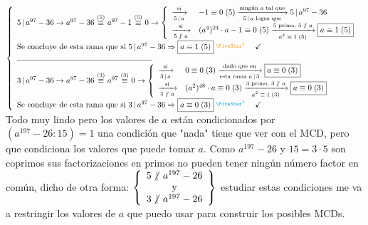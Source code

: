 $\llave{l}{
		5 \divideA a^{97} - 36 \to a^{97} - 36 \conga{5} a^{97} -1 \conga5 0
		\to
		\llave{ll}{
			\flecha{si}[$5 \divideA a$] & \congruencia{-1}{0}{5}
			\flecha{ningún $a$ tal que}[$5 \divideA a$ logra que] 5 \divideA a^{97} - 36 \\

			\flecha{si}[$5 \noDivide a$] & \congruencia{(a^4)^{24} \cdot a -1 }{0}{5}
			\flecha{5 primo, $5 \noDivide a$}[$\congruencia{a^4}{1}{5}$]
			\boxed{\congruencia{a}{1}{5}}
		}\\
		\text{Se concluye de esta rama que si } 5 \divideA a^{97} - 36
		\entonces
		\boxed{\congruencia{a}{1}{5}}\llamada3 \Tilde \\

		\separadorCorto

		3 \divideA a^{97} - 36 \to a^{97} - 36 \conga{3} a^{97} \conga3 0
		\to
		\llave{ll}{
			\flecha{si}[$3 \divideA a$] & \congruencia{0}{0}{3}
			\flecha{dado que en}[esta rama $a \divideA 3$] \boxed{ \congruencia{a}{0}{3} } \\
			\flecha{si}[$3 \noDivide a$] & \congruencia{(a^2)^{48} \cdot a}{0}{3}
			\flecha{3 primo, $3 \noDivide a$}[$\congruencia{a^2}{1}{3} $]
			\boxed{\congruencia{a}{0}{3}}
		}\\
		\text{Se concluye de esta rama que si } 3 \divideA a^{97} - 36
		\entonces
		\boxed{\congruencia{a}{0}{3}}\llamada4 \Tilde
	}$\\

Todo muy lindo pero los valores de $a$ están condicionados por  $(a^{197} - 26 : 15) = 1$
una condición que "nada" tiene que ver con el MCD, pero que condiciona los valores que puede
tomar $a$. Como $a^{197} - 26 $ y $15 = 3 \cdot 5$ son coprimos sus factorizaciones en primos
no pueden tener ningún número factor en común, dicho de otra forma:
$\llaves{c}{
		5 \noDivide  a^{197} - 26 \\
		\text{ y } \\
		3 \noDivide  a^{197} - 26
	}$ estudiar estas condiciones me va a restringir los valores de $a$ que puedo usar para construir
los posibles MCDs.\\

